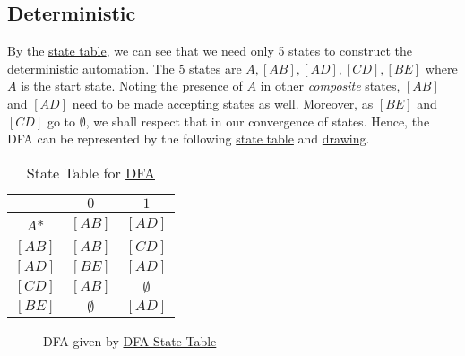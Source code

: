 \documentclass[11pt,letterpaper]{article}
\begin{document}
\subsection{Deterministic}
By the \hyperref[tab:nfa]{state table}, we can see that we need only 5 states to construct the deterministic automation. The 5 states are $A,[AB],[AD],[CD],[BE]$ where $A$ is the start state. Noting the presence of $A$ in other \textit{composite} states, $[AB]$ and $[AD]$ need to be made accepting states as well. Moreover, as $[BE]$ and $[CD]$ go to $\emptyset$, we shall respect that in our convergence of states. Hence, the DFA can be represented by the following \hyperref[tab:dfa]{state table} and \hyperref[fig:dfa]{drawing}.
\\
\begin{table}[!ht]
\centering
\begin{tabular}{c| c c}
     & $0$ & $1$  \\
    \hline
    $A$* & $[AB]$ & $[AD]$ \\
    $[AB]$ & $[AB]$ & $[CD]$ \\
    $[AD]$ & $[BE]$ & $[AD]$ \\
    $[CD]$ & $[AB]$ & $\emptyset$ \\
    $[BE]$ & $\emptyset$ & $[AD]$
\end{tabular}
\caption{State Table for \hyperref[fig:dfa]{DFA}}
\label{tab:dfa}
\end{table}
\begin{figure}[!ht]
\centering
{}
\caption{DFA given by \hyperref[tab:dfa]{DFA State Table}}
\label{fig:dfa}
\end{figure}
\end{document}
